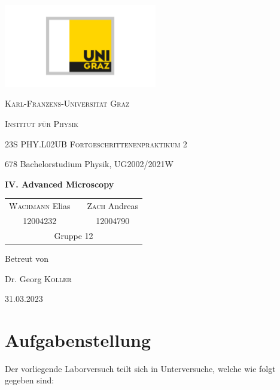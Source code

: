 \documentclass[ngerman]{scrartcl}
\begin{document}
\begin{titlepage}
    \centering
    \includegraphics[width=0.5\textwidth]{../../99_Misc/Logo_KF.pdf}\par\vspace{0.8cm}
    {\scshape\LARGE{Karl-Franzens-Universität Graz}\par}
    {\scshape\LARGE{Institut für Physik}\par}
    \vspace{1cm}
    {\scshape\Large{23S PHY.L02UB Fortgeschrittenenpraktikum 2}\par}
    678 Bachelorstudium Physik, UG2002/2021W\par
    \vspace{1.5cm}
    {\huge\bfseries IV. Advanced Microscopy\par}
    \vspace{2cm}
    \begin{table}[H]
        \centering
        \begin{tabular}{c c c}
            \Large \textsc{Wachmann} Elias &  & \Large \textsc{Zach} Andreas \\
            \Large 12004232                &  & \Large 12004790              \\
            \multicolumn{3}{c}{Gruppe 12}
        \end{tabular}
    \end{table}
    \vfill
    \Large Betreut von\par
    Dr. Georg \textsc{Koller}
    \vfill
    {\large 31.03.2023\par}
\end{titlepage}

\clearpage
\tableofcontents
\newpage

\section[Aufgabenstellung]{Aufgabenstellung \cite{ref:angabe}}
\label{sec:aufgabenstellung}

Der vorliegende Laborversuch teilt sich in Unterversuche, welche wie folgt gegeben sind:
\end{document}
